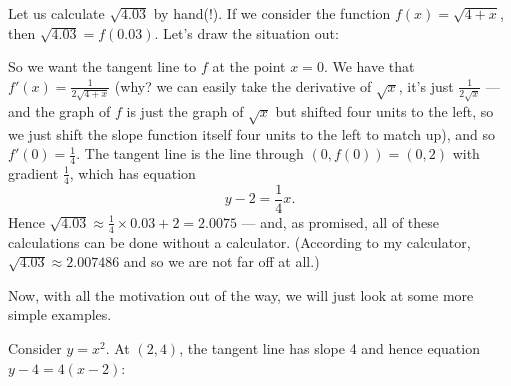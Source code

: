\begin{ex}
  Let us calculate $ \sqrt{4.03} $ by hand(!). If we consider the function $ f(x) = \sqrt{4 + x} $,
  then $ \sqrt{4.03} = f(0.03) $. Let's draw the situation out:
  \begin{center}
  \end{center}
  So we want the tangent line to $ f $ at the point $ x = 0 $. We have that $ f'(x) = \frac{1}{2\sqrt{4 + x}} $ (why? we can easily
  take the derivative of $ \sqrt{x} $, it's just $ \frac{1}{2\sqrt{x}} $ --- and the graph of $ f $ is just the graph of $ \sqrt{x} $
  but shifted four units to the left, so we just shift the slope function itself four units to the left to match up),
  and so $ f'(0) = \frac{1}{4} $. The tangent line is the line through $ (0, f(0)) = (0, 2) $ with gradient $ \frac{1}{4} $,
  which has equation
  \begin{displaymath}
    y - 2 = \frac{1}{4}x.
  \end{displaymath}
  Hence $ \sqrt{4.03} \approx \frac{1}{4} \times 0.03 + 2 = 2.0075 $ --- and, as promised, all of these calculations
  can be done without a calculator. (According to my calculator, $ \sqrt{4.03} \approx 2.007486 $ and so we are not far
  off at all.)
\end{ex}

Now, with all the motivation out of the way, we will just look at some more simple examples.
\begin{ex}
  Consider $ y = x^2 $. At $ (2,4) $, the tangent line has slope 4 and hence equation $ y - 4 = 4(x - 2) $:
  \begin{center}
  \end{center}
\end{ex}

